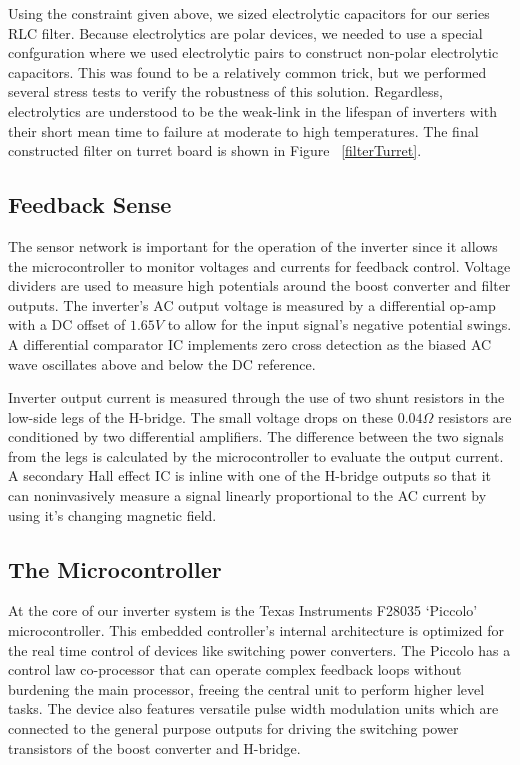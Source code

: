 Using the constraint given above, we sized electrolytic capacitors for our series RLC filter. Because electrolytics are polar devices, we needed to use a special confguration where we used electrolytic pairs to construct non-polar electrolytic capacitors. This was found to be a relatively common trick, but we performed several stress tests to verify the robustness of this solution. Regardless, electrolytics are understood to be the weak-link in the lifespan of inverters with their short mean time to failure at moderate to high temperatures. The final constructed filter on turret board is shown in Figure ~\ref{filterTurret}.  



\subsection{Feedback Sense}
The sensor network is important for the operation of the inverter since it allows the microcontroller to monitor voltages and currents for feedback control. Voltage dividers are used to measure high potentials around the boost converter and filter outputs. The inverter's AC output voltage is measured by a differential op-amp with a DC offset of $1.65V$ to allow for the input signal's negative potential swings. A differential comparator IC implements zero cross detection as the biased AC wave oscillates above and below the DC reference. 

Inverter output current is measured through the use of two shunt resistors in the low-side legs of the H-bridge. The small voltage drops on these $0.04\Omega$ resistors are conditioned by two differential amplifiers. The difference between the two signals from the legs is calculated by the microcontroller to evaluate the output current. A secondary Hall effect IC is inline with one of the H-bridge outputs so that it can noninvasively measure a signal linearly proportional to the AC current by using it's changing magnetic field.

\subsection{The Microcontroller}
At the core of our inverter system is the Texas Instruments F28035 `Piccolo' microcontroller. This embedded controller's internal architecture is optimized for the real time control of devices like switching power converters. The Piccolo has a control law co-processor that can operate complex feedback loops without burdening the main processor, freeing the central unit to perform higher level tasks. The device also features versatile pulse width modulation units which are connected to the general purpose outputs for driving the switching power transistors of the boost converter and H-bridge. 

